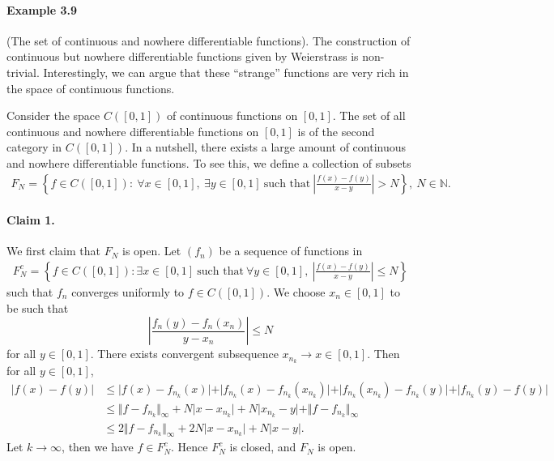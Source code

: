 \documentclass{article}
\begin{document}
\paragraph{Example 3.9\label{example:3.9}} (The set of continuous and nowhere differentiable functions). The construction of continuous but nowhere differentiable functions given by Weierstrass is non-trivial. Interestingly, we can argue that these ``strange'' functions are very rich in the space of continuous functions.

Consider the space $C([0,1])$ of continuous functions on $[0,1]$. The set of all continuous and nowhere differentiable functions on $[0,1]$ is of the second category in $C([0,1])$. In a nutshell, there exists a large amount of continuous and nowhere differentiable functions. To see this, we define a collection of subsets
\begin{align*}
	F_N=\left\{f\in C([0,1]):\ \forall x\in [0,1],\ \exists y\in[0,1]\ \text{such that}\ \left\vert\frac{f(x)-f(y)}{x-y}\right\vert>N\right\},\ N\in\mathbb{N}.
\end{align*}

\paragraph{Claim 1.} We first claim that $F_N$ is open. Let $(f_n)$ be a sequence of functions in
\begin{align*}
	F_N^c = \left\{f\in C([0,1]):\exists x\in[0,1]\ \text{such that}\ \forall y\in[0,1],\ \left\vert\frac{f(x)-f(y)}{x-y}\right\vert\leq N\right\}
\end{align*}
such that $f_n$ converges uniformly to $f\in C([0,1])$. We choose $x_n\in[0,1]$ to be such that $$\left\vert\frac{f_n(y)-f_n(x_n)}{y-x_n}\right\vert\leq N$$
for all $y\in [0,1]$. There exists convergent subsequence $x_{n_k}\to x\in[0,1]$. Then for all $y\in[0,1]$,
\begin{align*}
	\vert f(x)-f(y)\vert &\leq \vert f(x)-f_{n_k}(x)\vert + \vert f_{n_k}(x)-f_{n_k}(x_{n_k})\vert + \vert f_{n_k}(x_{n_k})-f_{n_k}(y)\vert + \vert f_{n_k}(y)-f(y)\vert\\
	&\leq \Vert f-f_{n_k}\Vert_\infty + N\vert x-x_{n_k}\vert + N\vert x_{n_k}-y\vert + \Vert f-f_{n_k}\Vert_\infty\\
	&\leq 2\Vert f-f_{n_k}\Vert_\infty + 2N\vert x-x_{n_k}\vert + N\vert x-y\vert.
\end{align*}
Let $k\to\infty$, then we have $f\in F_N^c$. Hence $F_N^c$ is closed, and $F_N$ is open.
\end{document}
